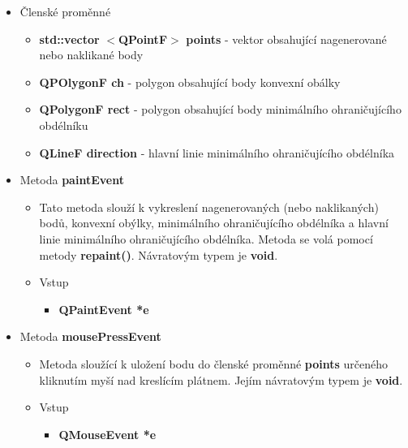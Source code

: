 \documentclass[a4paper, 12pt]{article}
\begin{document}
\begin{itemize}
	\item Členské proměnné
		\begin{itemize}
			\item \textbf{std::vector} $<$\textbf{QPointF}$>$ \textbf{points} - vektor obsahující nagenerované nebo naklikané body
			\item \textbf{QPOlygonF ch} - polygon obsahující body konvexní obálky
			\item \textbf{QPolygonF rect} - polygon obsahující body minimálního ohraničujícího obdélníku
			\item \textbf{QLineF direction} - hlavní linie minimálního ohraničujícího obdélníka
		\end{itemize}

	\item Metoda \textbf{paintEvent}
		\begin{itemize}
			\item Tato metoda slouží k vykreslení nagenerovaných (nebo naklikaných) bodů, konvexní obýlky, minimálního ohraničujícího obdélníka a hlavní linie minimálního ohraničujícího obdélníka. Metoda se volá pomocí metody \textbf{repaint()}. Návratovým typem je \textbf{void}.
			\item Vstup
				\begin{itemize}
					\item \textbf{QPaintEvent *e}
				\end{itemize}
		\end{itemize}

	\item Metoda \textbf{mousePressEvent}
		\begin{itemize}
			\item Metoda sloužící k uložení bodu do členské proměnné \textbf{points} určeného kliknutím myší nad kreslícím plátnem. Jejím návratovým typem je \textbf{void}.	
			\item Vstup
				\begin{itemize}
					\item \textbf{QMouseEvent *e}
				\end{itemize}
		\end{itemize}


\end{itemize}
\end{document}
